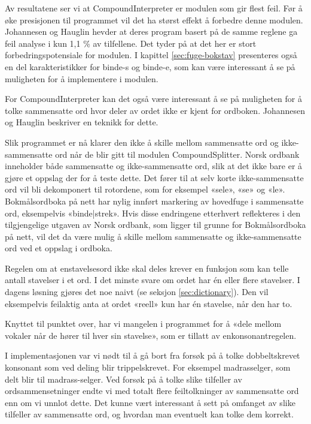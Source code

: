 \begin{items}
\item Av resultatene ser vi at CompoundInterpreter er modulen som gir flest feil. Før å øke presisjonen til programmet vil det ha størst effekt å forbedre denne modulen. Johannesen og Hauglin \cite{johannessen1996automatic} hevder at deres program basert på de samme reglene ga feil analyse i kun 1,1 \% av tilfellene. Det tyder på at det her er stort forbedringspotensiale for modulen. I kapittel \ref{sec:fuge-bokstav} presenteres også en del karakteristikker for binde-s og binde-e, som kan være interessant å se på muligheten for å implementere i modulen.
\item For CompoundInterpreter kan det også være interessant å se på muligheten for å tolke sammensatte ord hvor deler av ordet ikke er kjent for ordboken. Johannesen og Hauglin \cite[s. 10]{johannessen1996automatic} beskriver en teknikk for dette.
\item Slik programmet er nå klarer den ikke å skille mellom sammensatte ord og ikke-sammensatte ord når de blir gitt til modulen CompoundSplitter. Norsk ordbank inneholder både sammensatte og ikke-sammensatte ord, slik at det ikke bare er å gjøre et oppslag der for å teste dette. Det fører til at selv korte ikke-sammensatte ord vil bli dekomponert til rotordene, som for eksempel «sele», «se» og «le». Bokmålsordboka på nett  har nylig innført markering av hovedfuge i sammensatte ord, eksempelvis «binde|strek». Hvis disse endringene etterhvert reflekteres i den tilgjengelige utgaven av Norsk ordbank, som ligger til grunne for Bokmålsordboka på nett, vil det da være mulig å skille mellom sammensatte og ikke-sammensatte ord ved et oppslag i ordboka.
\item Regelen om at enstavelsesord ikke skal deles krever en funksjon som kan telle antall stavelser i et ord. I det minste svare om ordet har én eller flere stavelser. I dagens løsning gjøres det noe naivt (se seksjon \ref{sec:dictionary}). Den vil eksempelvis feilaktig anta at ordet «reell» kun har én stavelse, når den har to. 
\item Knyttet til punktet over, har vi mangelen i programmet for å «dele mellom vokaler når de hører til hver sin stavelse», som er tillatt av enkonsonantregelen. 
\item I implementasjonen var vi nødt til å gå bort fra forsøk på å tolke dobbeltskrevet konsonant som ved deling blir trippelskrevet. For eksempel madrasselger, som delt blir til madrass-selger. Ved forsøk på å tolke slike tilfeller av ordsammensetninger endte vi med totalt flere feiltolkninger av sammensatte ord enn om vi unnlot dette. Det kunne vært interessant å sett på omfanget av slike tilfeller av sammensatte ord, og hvordan man eventuelt kan tolke dem korrekt.

\end{items}
